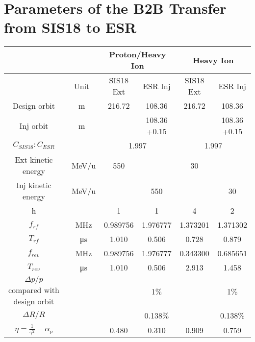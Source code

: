 \newpage
\section{Parameters of the B2B Transfer from SIS18 to ESR}
\label{sec:18toESR}



% 
    \begin{longtable}{ | c | c | c | c | c | c |}
    \hline
		\rowcolor[gray]{0.8}
     	 &  & \multicolumn{2}{c|}{Proton/Heavy Ion} & \multicolumn{2}{c|}{Heavy Ion} \\ \hline
		 & Unit &	SIS18 Ext & ESR Inj & SIS18 Ext &	ESR Inj\\ \hline
Design orbit &	m &	 216.72&108.36&	216.72&108.36	\\ \hline
Inj orbit &	m &	 &\tabincell{c}{108.36\\+0.15}&	&\tabincell{c}{108.36\\+0.15}	\\ \hline
$C_{SIS18}:C_{ESR}$&	&	\multicolumn{2}{c|}{1.997}&\multicolumn{2}{c|}{1.997}	\\ \hline
\tabincell{c}{Ext kinetic\\ energy}&	\SI{}{\MeV/\atomicmassunit}&	550 & &30&	\\ \hline
\tabincell{c}{Inj kinetic\\ energy}&	\SI{}{\MeV/\atomicmassunit}&	&550&	&30	\\ \hline
  h&	&1&1&4&2	\\ \hline
$f_{rf}$&\SI{}{\MHz}&	0.989756&1.976777&1.373201&1.371302	\\ \hline
$T_{rf}$&\SI{}{\us}&	1.010&0.506&0.728&0.879\\ \hline
$f_{rev}$&\SI{}{\MHz}&	0.989756&1.976777&0.343300&0.685651\\ \hline
$T_{rev}$&\SI{}{\us}&	1.010&0.506&2.913&1.458\\ \hline
\tabincell{c}{$\Delta p/p$ compared \\with design orbit}&	&&1$\%$&&1$\%$\\ \hline
$\Delta R/R$&	&&0.138$\%$&&0.138$\%$\\ \hline
$\eta=\frac{1}{\gamma^2}-\alpha_p$ &	&0.480	&0.310&	0.909&	0.759\\ \hline

\end{longtable}
